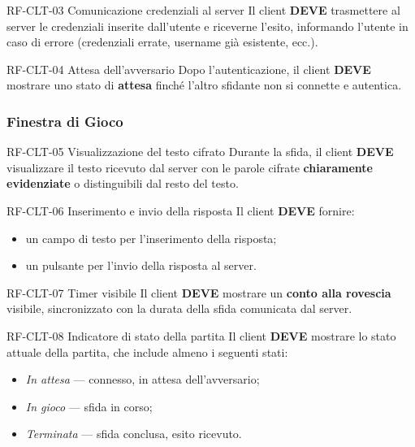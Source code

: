 \documentclass[12pt, a4paper]{article}
\newcommand{\mustshall}{\textbf{DEVE}}
\begin{document}
\begin{reqbox}{RF-CLT-03 \quad Comunicazione credenziali al server \quad [MUST]}
Il client \mustshall{} trasmettere al server le credenziali inserite dall'utente e riceverne l'esito, informando l'utente in caso di errore (credenziali errate, username già esistente, ecc.).
\end{reqbox}

\begin{reqbox}{RF-CLT-04 \quad Attesa dell'avversario \quad [MUST]}
Dopo l'autenticazione, il client \mustshall{} mostrare uno stato di \textbf{attesa} finché l'altro sfidante non si connette e autentica.
\end{reqbox}

\subsubsection{Finestra di Gioco}

\begin{reqbox}{RF-CLT-05 \quad Visualizzazione del testo cifrato \quad [MUST]}
Durante la sfida, il client \mustshall{} visualizzare il testo ricevuto dal server con le parole cifrate \textbf{chiaramente evidenziate} o distinguibili dal resto del testo.
\end{reqbox}

\begin{reqbox}{RF-CLT-06 \quad Inserimento e invio della risposta \quad [MUST]}
Il client \mustshall{} fornire:
\begin{itemize}
    \item un campo di testo per l'inserimento della risposta;
    \item un pulsante per l'invio della risposta al server.
\end{itemize}
\end{reqbox}

\begin{reqbox}{RF-CLT-07 \quad Timer visibile \quad [MUST]}
Il client \mustshall{} mostrare un \textbf{conto alla rovescia} visibile, sincronizzato con la durata della sfida comunicata dal server.
\end{reqbox}

\begin{reqbox}{RF-CLT-08 \quad Indicatore di stato della partita \quad [MUST]}
Il client \mustshall{} mostrare lo stato attuale della partita, che include almeno i seguenti stati:
\begin{itemize}
    \item \textit{In attesa} — connesso, in attesa dell'avversario;
    \item \textit{In gioco} — sfida in corso;
    \item \textit{Terminata} — sfida conclusa, esito ricevuto.
\end{itemize}
\end{reqbox}
\end{document}
